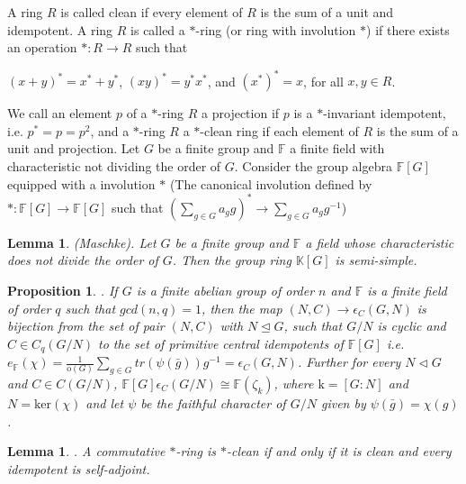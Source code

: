 \documentclass[12pt, reqno]{amsart}
\numberwithin{equation}{section}
\theoremstyle{definition}
\theoremstyle{remark}
\theoremstyle{plain}
\newtheorem{lemma}[definition]{Lemma}
\newtheorem{proposition}[definition]{Proposition}
\begin{document}
A ring $R$ is called clean if every element of $R$ is the sum of a unit and idempotent. A ring $R$ is called a $*$-ring (or ring with involution $*$) if there exists an operation $*:R\rightarrow R$ such that\smallskip

$(x+y)^*=x^*+y^*$, $(xy)^*=y^*x^*$, and $(x^*)^*=x$, for all $x,y\in R$.\smallskip

We call an element $p$ of a $*$-ring $R$ a projection if $p$ is a $*$-invariant idempotent, i.e. $p^* = p = p^2$, and a $*$-ring $R$ a $*$-clean ring if each element of $R$ is the sum of a unit and projection. Let $G$ be a finite group and $\mathbb{F}$ a finite field with characteristic not dividing the order of $G$. Consider the group algebra $\mathbb{F}[G]$ equipped with a involution $*$ (The canonical involution defined by $*:\mathbb{F}[G]\rightarrow \mathbb{F}[G]$ such that $(\sum_{g\in G}a_gg)^*\rightarrow\sum_{g\in G}a_gg^{-1}$)\cite{Wood} 
\begin{lemma}{(Maschke)}\label{L: characteristic}
 \cite[Theorem 1.2]{S. Lang}. Let $G$ be a finite group and $\mathbb{F}$ a field whose characteristic does not divide the order of $G$. Then the group ring $\mathbb{K}[G]$ is semi-simple. 
\end{lemma}
\begin{proposition}\label{P: abelian}
\cite{Broch}. If $G$ is a finite abelian group of order $n$ and $\mathbb{F}$ is a finite field of order $q$ such that $gcd(n,q)=1$, then the map $(N,C)\rightarrow\epsilon_C(G,N)$ is bijection from the set of pair $(N,C)$ with $N\trianglelefteq G$, such that $G/N$ is cyclic and $C\in C_q(G/N)$ to the set of primitive central idempotents of $\mathbb{F}[G]$ i.e. $e_{\mathbb{F}}(\chi)=\frac{1}{\text{o}(G)}\sum_{g\in G}tr(\psi(\bar{g}))g^{-1}=\epsilon_C(G,N)$. Further for every $N\triangleleft G$ and $C\in C(G/N)$, $\mathbb{F}[G]\epsilon_C(G/N)\cong \mathbb{F}(\zeta_k)$, where $\text{k}=[G:N]$ and $N=\text{ker}(\chi)$ and let $\psi$ be the faithful character of $G/N$ given by $\psi(\bar{g})=\chi(g)$.
\end{proposition}
\begin{lemma}\label{L: commutative}
 \cite[Theorem 2.2]{C. Li}. A commutative $*$-ring is $*$-clean if and only if it is clean and every idempotent is self-adjoint.
\end{lemma}
\end{document}
